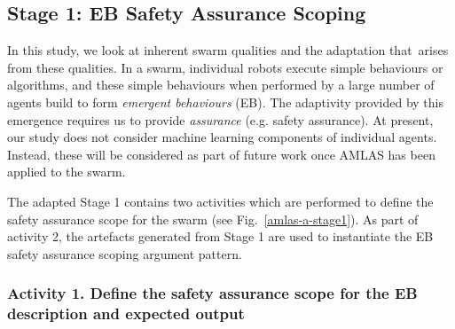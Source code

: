 \documentclass[lettersize,journal]{IEEEtran}
\begin{document}
\subsection{Stage 1: EB Safety Assurance Scoping} \label{framework-stage1}
In this study, we look at inherent swarm qualities and the adaptation that arises from these qualities. 
In a swarm, individual robots execute simple behaviours or algorithms, and these simple behaviours when performed by a large number of agents build to form \emph{emergent behaviours} (EB). 
The adaptivity provided by this emergence requires us to provide \textit{assurance} (e.g. safety assurance). 
At present, our study does not consider machine learning components of individual agents. Instead, these will be considered as part of future work once AMLAS has been applied to the swarm.

The adapted Stage 1 contains two activities which are performed to define the safety assurance scope for the swarm (see Fig.~\ref{amlas-a-stage1}).  
As part of activity 2, the artefacts generated from Stage 1 are used to instantiate the EB safety assurance scoping argument pattern. 

\subsubsection*{Activity 1. Define the safety assurance scope for the EB description and expected output}
\end{document}
